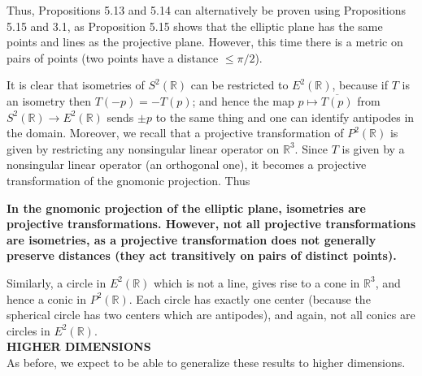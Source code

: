 \documentclass[leqno]{book}
\begin{document}
\noindent Thus, Propositions 5.13 and 5.14 can alternatively be proven using Propositions 5.15 and 3.1, as Proposition 5.15 shows that the elliptic plane has the same points and lines as the projective plane.  However, this time there is a metric on pairs of points (two points have a distance $\leqslant\pi/2$).

It is clear that isometries of $S^2(\mathbb R)$ can be restricted to $E^2(\mathbb R)$, because if $T$ is an isometry then $T(-p)=-T(p)$; and hence the map $p\mapsto\overline{T(p)}$ from $S^2(\mathbb R)\to E^2(\mathbb R)$ sends $\pm p$ to the same thing and one can identify antipodes in the domain. %
Moreover, we recall that a projective transformation of $P^2(\mathbb R)$ is given by restricting any nonsingular linear operator on $\mathbb R^3$.  Since $T$ is given by a nonsingular linear operator (an orthogonal one), it becomes a projective transformation of the gnomonic projection.  Thus
\begin{center}
\textbf{In the gnomonic projection of the elliptic plane, isometries are projective transformations.  However, not all projective transformations are isometries, as a projective transformation does not generally preserve distances (they act transitively on pairs of distinct points).}
\end{center}
Similarly, a circle in $E^2(\mathbb R)$ which is not a line, gives rise to a cone in $\mathbb R^3$, and hence a conic in $P^2(\mathbb R)$.  Each circle has exactly one center (because the spherical circle has two centers which are antipodes), and again, not all conics are circles in $E^2(\mathbb R)$.\\

\noindent\textbf{HIGHER DIMENSIONS}\\

\noindent As before, we expect to be able to generalize these results to higher dimensions.
\end{document}
